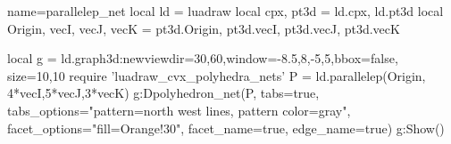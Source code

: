 \begin{luadraw}{name=parallelep_net}
local ld = luadraw
local cpx, pt3d = ld.cpx, ld.pt3d
local Origin, vecI, vecJ, vecK = pt3d.Origin, pt3d.vecI, pt3d.vecJ, pt3d.vecK

local g = ld.graph3d:new{viewdir={30,60},window={-8.5,8,-5,5},bbox=false, size={10,10}}
require 'luadraw_cvx_polyhedra_nets'
P = ld.parallelep(Origin, 4*vecI,5*vecJ,3*vecK)
g:Dpolyhedron_net(P, {tabs=true, tabs_options="pattern=north west lines, pattern color=gray",
  facet_options="fill=Orange!30", facet_name=true, edge_name=true})
g:Show()
\end{luadraw}
